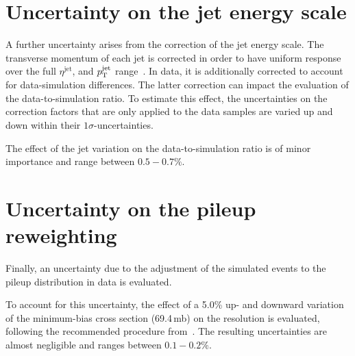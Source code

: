 \section*{Uncertainty on the jet energy scale}
A further uncertainty arises from the correction of the jet energy scale.
The transverse momentum of each jet is corrected in order to have uniform response over the full $\eta^{\text{jet}}$, and $p_{\text{T}}^{\text{jet}}$ range~\cite{bib:CMS:JME_PAS}.
In data, it is additionally corrected to account for data-simulation differences.
The latter correction can impact the evaluation of the data-to-simulation ratio.
To estimate this effect, the uncertainties on the correction factors that are only applied to the data samples are varied up and down within their $1\sigma$-uncertainties.

The effect of the jet \pt variation on the data-to-simulation ratio is of minor importance and range between $0.5-0.7\%$.


\section*{Uncertainty on the pileup reweighting}
Finally, an uncertainty due to the adjustment of the simulated events to the pileup distribution in data is evaluated.

To account for this uncertainty, the effect of a 5.0\% up- and downward variation of the minimum-bias cross section (69.4\,mb) on the resolution is evaluated, following the recommended procedure from~\cite{bib:CMS:PileupSysUnc}.
The resulting uncertainties are almost negligible and ranges between $0.1-0.2\%$.

\FloatBarrier

